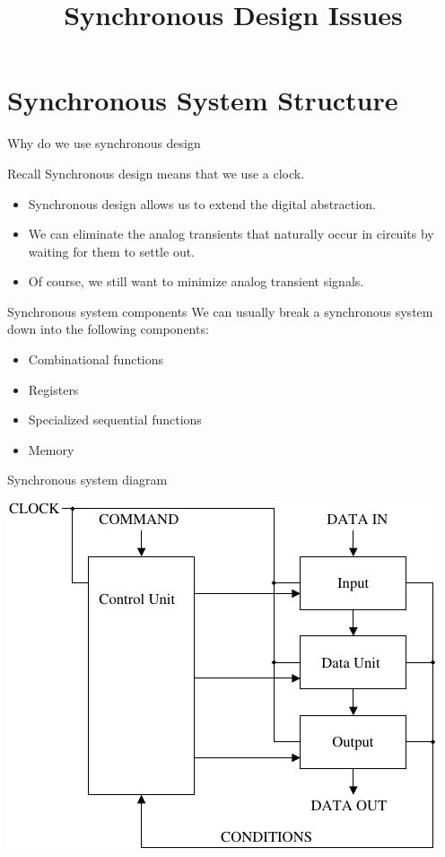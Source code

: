 \title{Synchronous Design Issues}

\section{Synchronous System Structure}

\begin{frame}{Why do we use synchronous design}
  \begin{block}{Recall}
    Synchronous design means that we use a clock.
  \end{block}
  \begin{itemize}
    \item Synchronous design allows us to extend the digital abstraction.
    \item We can eliminate the analog transients that naturally occur in circuits by waiting for them to settle out.
    \item Of course, we still want to minimize analog transient signals.
  \end{itemize}
\end{frame}

\begin{frame}{Synchronous system components}
  We can usually break a synchronous system down into the following components:
  \begin{itemize}
    \item Combinational functions
    \item Registers
    \item Specialized sequential functions
    \item Memory
  \end{itemize}
\end{frame}

\begin{frame}{Synchronous system diagram}
  \begin{center}
    \includegraphics{SynchronousSystemStructure}
  \end{center}
\end{frame}

